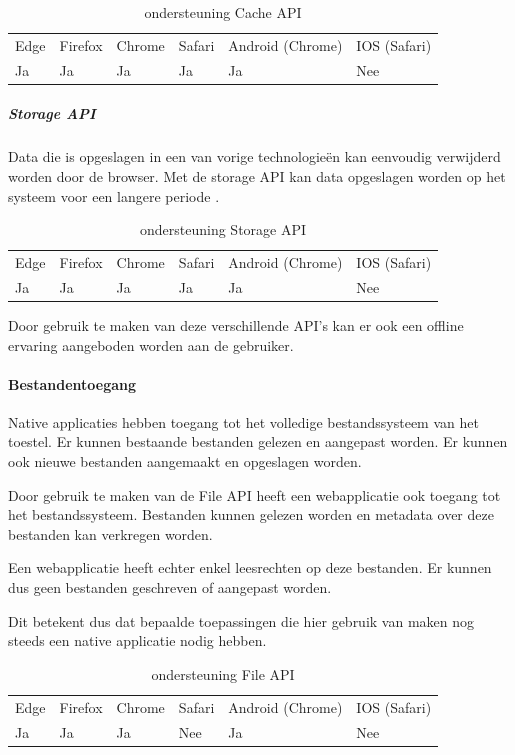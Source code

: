 	\begin{table}[H]
		\centering
			\begin{tabular}{llllll}
				Edge & Firefox & Chrome & Safari & Android (Chrome) & IOS (Safari) \\
				Ja   & Ja      &  Ja     & Ja     & Ja               & Nee          
			\end{tabular}	
			\caption{ondersteuning Cache API}
	\end{table}
	
	
	\subparagraph{Storage API}
	Data die is opgeslagen in een van vorige technologieën kan eenvoudig verwijderd worden door de browser. Met de storage API kan data opgeslagen worden op het systeem voor een langere periode .
	\autocite{Mozilla2020b}
	
	\begin{table}[H]
		\centering
		\begin{tabular}{llllll}
			Edge & Firefox & Chrome & Safari & Android (Chrome) & IOS (Safari) \\
			Ja   & Ja      &  Ja     & Ja     & Ja               & Nee          
		\end{tabular}	
		\caption{ondersteuning Storage API}
	\end{table}
	
	
	
Door gebruik te maken van deze verschillende API’s kan er ook een offline ervaring aangeboden worden aan de gebruiker. 
	
\paragraph{Bestandentoegang}

Native applicaties hebben toegang tot het volledige bestandssysteem van het toestel. Er kunnen bestaande bestanden gelezen en aangepast worden. Er kunnen ook nieuwe bestanden aangemaakt en opgeslagen worden.

Door gebruik te maken van de File API \autocite{Kruisselbrink2020} heeft een webapplicatie ook toegang tot het bestandssysteem. Bestanden kunnen gelezen worden en metadata over deze bestanden kan verkregen worden.

Een webapplicatie heeft echter enkel leesrechten op deze bestanden. Er kunnen dus geen bestanden geschreven of aangepast worden.

Dit betekent dus dat bepaalde toepassingen die hier gebruik van maken nog steeds een native applicatie nodig hebben.

\begin{table}[H]
	\centering
	\begin{tabular}{llllll}
		Edge & Firefox & Chrome & Safari & Android (Chrome) & IOS (Safari) \\
		Ja   & Ja      &  Ja     & Nee     & Ja               & Nee          
	\end{tabular}	
	\caption{ondersteuning File API}
\end{table}	



